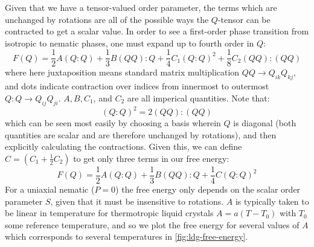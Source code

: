 \documentclass[reqno]{article}
\begin{document}
  Given that we have a tensor-valued order parameter, the terms which are
  unchanged by rotations are all of the possible ways the $Q$-tensor can be
  contracted to get a scalar value.
  In order to see a first-order phase transition from isotropic to nematic
  phases, one must expand up to fourth order in $Q$:
  \begin{equation}
    F(Q)
    =
    \frac12 A (Q:Q)
    + \frac13 B (QQ):Q
    + \frac14 C_1 (Q:Q)^2
    + \frac18 C_2 (QQ):(QQ)
  \end{equation}
  where here juxtaposition means standard matrix multiplication $QQ \to Q_{ik}
  Q_{kj}$, and dots indicate contraction over indices from innermost to
  outermost $Q:Q \to Q_{ij} Q_{ji}$.
  $A, B, C_1$, and $C_2$ are all imperical quantities.
  Note that:
  \begin{equation}
    (Q:Q)^2 = 2(QQ):(QQ)
  \end{equation}
  which can be seen most easily by choosing a basis wherein $Q$ is diagonal
  (both quantities are scalar and are therefore unchanged by rotations), and
  then explicitly calculating the contractions.
  Given this, we can define $C = (C_1 + \tfrac12 C_2)$ to get only three terms in
  our free energy:
  \begin{equation} \label{eq:landau-de-gennes-bulk-energy}
    F(Q)
    =
    \frac12 A(Q:Q)
    + \frac13 B (QQ):Q
    + \frac14 C (Q:Q)^2
  \end{equation}
  For a uniaxial nematic ($P = 0$) the free energy only depends on the scalar
  order parameter $S$, given that it must be insensitive to rotations.
  $A$ is typically taken to be linear in temperature for thermotropic liquid
  crystals $A = a(T - T_0)$ with $T_0$ some reference temperature, and so we plot
  the free energy for several values of $A$ which corresponds to several
  temperatures in \ref{fig:ldg-free-energy}.
  
\end{document}
